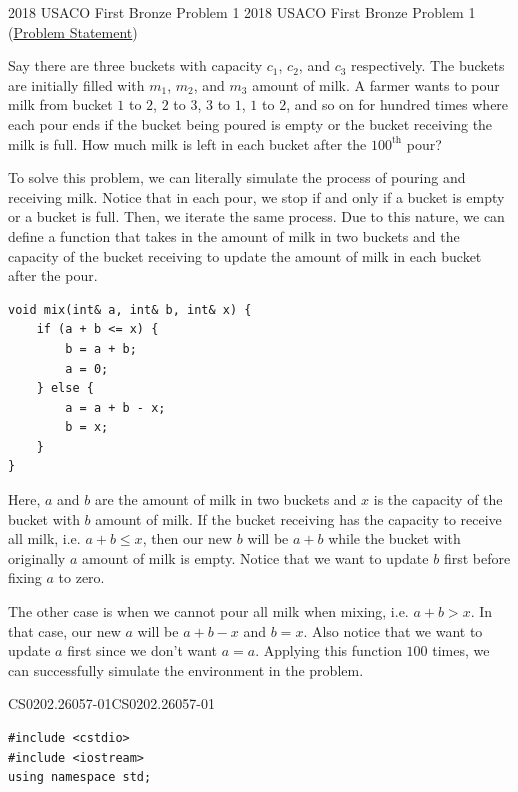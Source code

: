\documentclass[../../main.tex]{subfiles}
\begin{document}
\begin{problem}
{2018 USACO First Bronze Problem 1}
{2018 USACO First Bronze Problem 1}
(\href{https://usaco.org/index.php?page=viewproblem2&cpid=855}{Problem Statement})

Say there are three buckets with capacity $c_1$, $c_2$, and $c_3$
respectively. The buckets are initially filled with $m_1$, $m_2$,
and $m_3$ amount of milk. A farmer wants to pour milk from bucket
$1$ to $2$, $2$ to $3$, $3$ to $1$, $1$ to $2$, and so on for
hundred times where each pour ends if the bucket being poured is
empty or the bucket receiving the milk is full. How much milk is
left in each bucket after the $100^\text{th}$ pour?
\end{problem}
\begin{solution}
To solve this problem, we can literally simulate the process of
pouring and receiving milk. Notice that in each pour, we stop
if and only if a bucket is empty or a bucket is full. Then, we
iterate the same process. Due to this nature, we can define a
function that takes in the amount of milk in two buckets and the
capacity of the bucket receiving to update the amount of milk in
each bucket after the pour.

\begin{basicboxSolution}
\begin{lstlisting}[style=basic]
void mix(int& a, int& b, int& x) {
    if (a + b <= x) {
        b = a + b;
        a = 0;
    } else {
        a = a + b - x;
        b = x;
    }
}
\end{lstlisting}
\end{basicboxSolution}

Here, $a$ and $b$ are the amount of milk in two buckets and $x$
is the capacity of the bucket with $b$ amount of milk. If the
bucket receiving has the capacity to receive all milk, i.e.
$a + b \leq x$, then our new $b$ will be $a + b$ while the bucket
with originally $a$ amount of milk is empty. Notice that we want
to update $b$ first before fixing $a$ to zero.

The other case is when we cannot pour all milk when mixing, i.e.
$a + b > x$. In that case, our new $a$ will be $a + b - x$ and
$b = x$. Also notice that we want to update $a$ first since we don't
want $a = a$. Applying this function $100$ times, we can successfully
simulate the environment in the problem.

\begin{cppboxSolution}{CS0202.26057-01}{CS0202.26057-01}
\begin{lstlisting}[style=cppstyle]
#include <cstdio>
#include <iostream>
using namespace std;


\end{lstlisting}
\end{cppboxSolution}
\end{solution}
\end{document}
